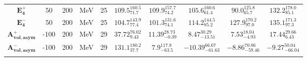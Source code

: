 \begin{tabular}{ c c c c c c c c c c}
$\mathbf{E_{4}^{+}}$ & 50 & 200 & MeV & 25 & $109.5^{160.5}_{71.7}$ & $109.9^{157.7}_{74.2}$ & $105.6^{160.6}_{61.4}$ & $90.0^{125.8}_{65.7}$ & $132.2^{178.0}_{85.1}$\\ 
$\mathbf{E_{4}^{-}}$ & 50 & 200 & MeV & 25 & $104.7^{143.9}_{77.4}$ & $101.3^{131.6}_{74.1}$ & $114.2^{144.5}_{85.2}$ & $127.9^{170.2}_{97.0}$ & $135.1^{171.3}_{97.3}$\\ 
$\mathbf{A_{vol,asym}^{+}}$ & -100 & 200 & MeV & 29 & $37.72^{76.02}_{9.43}$ & $11.39^{28.73}_{-0.39}$ & $8.47^{30.29}_{-13.51}$ & $7.53^{18.04}_{-4.93}$ & $17.44^{29.66}_{6.43}$\\ 
$\mathbf{A_{vol,asym}^{-}}$ & -100 & 200 & MeV & 29 & $131.1^{180.2}_{37.7}$ & $7.9^{117.8}_{-63.5}$ & $-10.39^{66.67}_{-61.63}$ & $-8.86^{70.86}_{-59.46}$ & $-9.27^{50.04}_{-66.04}$\\ 
\\ 
\end{tabular}
\egroup